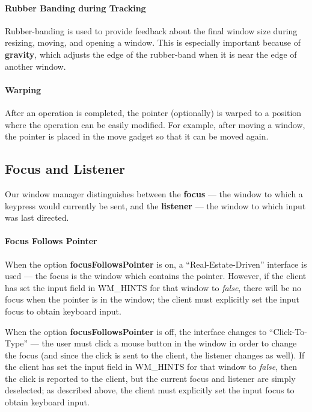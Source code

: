 \paragraph{Rubber Banding during Tracking}

Rubber-banding is used to provide feedback about the final window size
during resizing, moving, and opening a window.  This is especially
important because of {\bf gravity}, which adjusts the edge of the
rubber-band when it is near the edge of another window.

\paragraph{Warping}

After an operation is completed, the pointer (optionally) is warped to a
position where the operation can be easily modified.
For example, after moving a window, the pointer is placed in the move
gadget so that it can be moved again.

\subsection{Focus and Listener}

Our window manager distinguishes between the {\bf focus} --- the window
to which a keypress would currently be sent, and the {\bf listener} --- the
window to which input was last directed.

\paragraph{Focus Follows Pointer}

When the option {\bf focusFollowsPointer} is on, a ``Real-Estate-Driven''
interface is used --- the focus is the
window which contains the pointer.  However, if the client has
set the input field in {\sc WM\_HINTS} for that window to {\it false}, there will
be no focus when the pointer is in the window; the client must
explicitly set the input focus to obtain keyboard input.

When the option {\bf focusFollowsPointer} is off, the interface changes
to ``Click-To-Type'' --- the user must click a
mouse button in the window in order to change the focus (and since the
click is sent to the client, the listener changes as well).  If the
client has set the input field in {\sc WM\_HINTS} for that window to {\it false},
then the click is reported to the client, but the current focus and
listener are simply deselected; as described above, the client must
explicitly set the input focus to obtain keyboard input.


